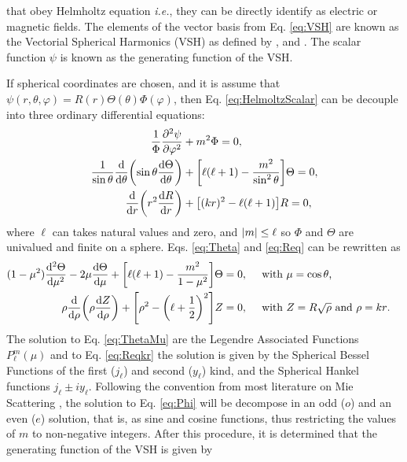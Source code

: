 that obey Helmholtz equation \textit{i.e.}, they can be directly identify as electric or magnetic fields. The elements of the vector basis from Eq. \eqref{eq:VSH}   are known as the Vectorial Spherical Harmonics (VSH) as defined by  \citeauthor{stratton_electromagnetic_2012} \cite{stratton_electromagnetic_2012}, and \citeauthor{bohren_absorption_1983} \cite{bohren_absorption_1983}. The scalar function $\psi$ is known as the generating function of the VSH.


If spherical coordinates are chosen, and it is assume that $\psi(r,\theta,\varphi) = R(r)\Theta(\theta)\Phi(\varphi)$, then Eq. \eqref{eq:HelmoltzScalar} can be decouple into three ordinary differential equations:
%
 \begin{align}
	\frac{1}{\Phi}\pdv[2]{\psi}{\varphi} &+ m^2 \Phi =0,
 \label{eq:Phi}\\
	\frac{1}{\sin\theta}\dv{\theta}\qty(\sin\theta\dv{\Theta}{\theta}) &+ \qty[\ell(\ell+1)- \frac{m^2}{\sin^2\theta}]\Theta =0,
	\label{eq:Theta}\\
	\dv{r}\qty(r^2\dv{R}{r}) &+ \qty[ (k r)^2 - \ell (\ell +1)] R =0,
 \label{eq:Req}
\end{align}	
%
where $\ell$ can takes natural values and zero, and $\abs{m}\leq \ell$ so $\Phi$ and $\Theta$ are univalued and finite on a sphere. Eqs. \eqref{eq:Theta} and \eqref{eq:Req} can be rewritten as
%
 \begin{align}
(1-\mu^2)\dv[2]{\Theta}{\mu} - 2\mu\dv{\Theta}{\mu} + \qty[\ell(\ell+1)-\frac{m^2}{1-\mu^2}]\Theta &= 0, \qqtext{ with $\mu = \cos\theta$,}
	\label{eq:ThetaMu}\\
	\rho\dv{\rho}\qty(\rho\dv{Z}{\rho}) +  \qty[\rho^2 - \qty(\ell + \frac12)^2]Z  &= 0,  \qqtext{ with $Z = R\sqrt{\rho}$ and $\rho = kr$.}
\label{eq:Reqkr}
\end{align}	
%
The solution to Eq. \eqref{eq:ThetaMu} are the Legendre Associated Functions $ P_\ell^m(\mu)$ and to Eq. \eqref{eq:Reqkr} the solution is given by the Spherical Bessel Functions of the first ($j_\ell$)  and second ($y_\ell$) kind, and the Spherical Hankel functions $j_\ell \pm iy_\ell$. Following the convention from most literature on Mie Scattering \cite{zangwill_modern_2013}, the solution to Eq. \eqref{eq:Phi} will be decompose in an odd ($o$) and an even ($e$) solution, that is, as sine and cosine functions, thus restricting the values of $m$ to non-negative integers. After this procedure, it is determined that the generating function of the VSH is given by
